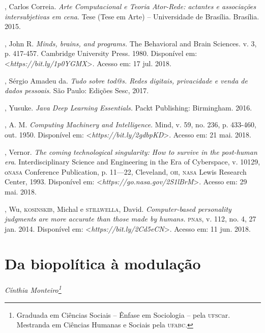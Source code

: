 \begin{bibliohedra}
, Carlos Correia. \emph{Arte Computacional e Teoria Ator-Rede:
actantes e associações intersubjetivas em cena}. Tese (Tese em Arte) --
Universidade de Brasília. Brasília. 2015.

, John R. \emph{Minds, brains, and programs.} The Behavioral and
Brain Sciences. v. 3, p. 417-457. Cambridge University Press. 1980.
Disponível em: \textless{}\emph{https://bit.ly/1p0YGMX}\textgreater{}. Acesso em: 17 jul. 2018.

, Sérgio Amadeu da. \emph{Tudo sobre tod@s. Redes digitais,
privacidade e venda de dados pessoais}. São Paulo: Edições Sesc, 2017.

, Yusuke. \emph{Java Deep Learning Essentials.} Packt
Publishing: Birmingham. 2016.

, A. M. \emph{Computing Machinery and Intelligence}. Mind, v.
59, no. 236, p. 433-460, out. 1950. Disponível em: \textless{}\emph{https://bit.ly/2gdbpKD}\textgreater{}. Acesso em: 21 mai. 2018.

, Vernor. \emph{The coming technological singularity: How to
survive in the post-human era}. Interdisciplinary Science and
Engineering in the Era of Cyberspace, v. 10129, o\textsc{nasa} Conference
Publication, p. 11---22, Cleveland, \textsc{oh}, \textsc{nasa} Lewis Research Center,
1993. Disponível em: \textless{}\emph{https://go.nasa.gov/2S1lBrM}\textgreater{}. Acesso em: 29 mai. 2018.

, Wu, \textsc{kosinskib}, Michal e \textsc{stillwella}, David.
\emph{Computer-based personality judgments are more accurate than
those made by humans.} \textsc{pnas}, v. 112, no. 4, 27 jan. 2014. Disponível em:
\textless{}\emph{https://bit.ly/2Cd5eCN}\textgreater{}. Acesso em: 11 jun. 2018.
\end{bibliohedra}


\chapter*{Da biopolítica à modulação }


\begin{flushright}
\emph{Cínthia Monteiro\footnote{Graduada em Ciências Sociais -- Ênfase em Sociologia -- pela \textsc{ufsc}ar. Mestranda em Ciências Humanas e Sociais pela \textsc{ufabc}.}}
\end{flushright}

